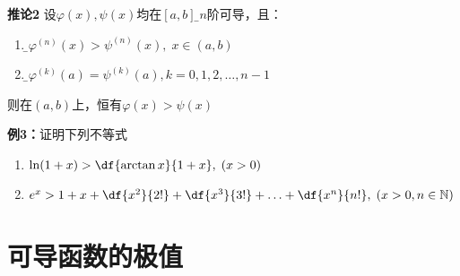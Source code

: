 \begin{frame}
	\linespread{1.2}
	\begin{alertblock}{{\bf 推论2}\hfill}
		设$\varphi(x),\psi(x) $均在$[a,b]$上{\b $n$阶可导}，且：
		\begin{enumerate}
		  \item {\b $\varphi^{(n)}(x)>\psi^{(n)}(x),\;x\in(a,b)$}
		  \item {\b $\varphi^{(k)}(a)=\psi^{(k)}(a),k=0,1,2,\ldots,n-1$}
		\end{enumerate}
		则在$(a,b)$上，恒有$\varphi(x)>\psi(x)$
	\end{alertblock}
	\pause
	\begin{exampleblock}{{\bf 例3：}证明下列不等式\hfill}
		\begin{enumerate}
		  \item $\ln(1+x)>\df{\arctan x}{1+x},\;(x>0)$\pause
		  \item $e^x>1+x+\df
		  {x^2}{2!}+\df{x^3}{3!}+\ldots+\df{x^n}{n!},\;(x>0,n\in\mathbb{N})$
		\end{enumerate}
	\end{exampleblock}
\end{frame}

\section{可导函数的极值}


